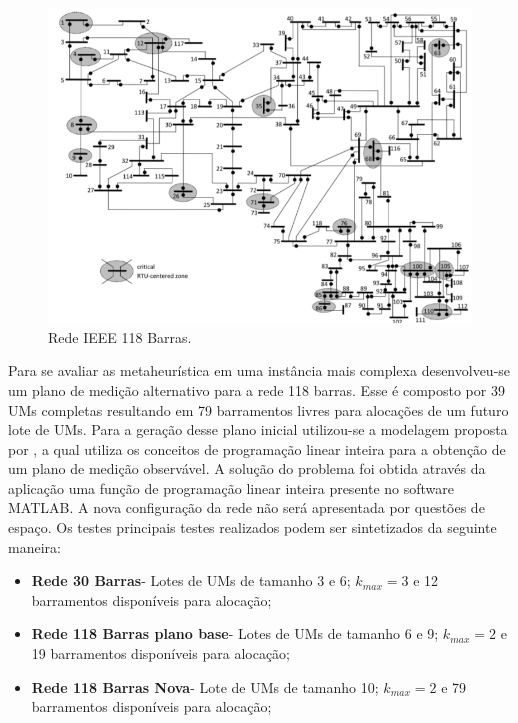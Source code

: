 \documentclass[12pt]{article}
\begin{document}
\begin{figure}[H]
	\centering 
	\includegraphics[scale=0.8]{figuras/Rede118bus.jpg}
	\caption{Rede IEEE 118 Barras.\cite{Quant13}}
	\label{fig13} %
\end{figure}

Para se avaliar as metaheurística em uma instância mais complexa desenvolveu-se um plano de medição alternativo para a rede 118 barras. Esse é composto por 39 UMs completas resultando em 79 barramentos livres para alocações de um futuro lote de UMs. Para a geração desse plano inicial utilizou-se a modelagem proposta por \cite{Gou08_1}, a qual utiliza os conceitos de programação linear inteira para a obtenção de um plano de medição observável. A solução do problema foi obtida através da aplicação uma função de programação linear inteira presente no software MATLAB\textregistered. A nova configuração da rede não será apresentada por questões de espaço. Os testes principais testes realizados podem ser sintetizados da seguinte maneira:

\begin{itemize}
	\item \textbf{Rede 30 Barras}- Lotes de UMs de tamanho 3 e 6; $k_{max}=3$ e 12 barramentos disponíveis para alocação;

	\item \textbf{Rede 118 Barras plano base}- Lotes de UMs de tamanho 6 e 9; $k_{max}=2$ e 19 barramentos disponíveis para alocação;

	\item \textbf{Rede 118 Barras Nova}- Lote de UMs de tamanho 10; $k_{max}=2$ e 79 barramentos disponíveis para alocação;
\end{itemize}
\end{document}

